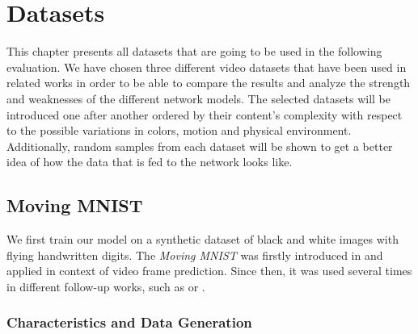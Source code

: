 
\chapter{Datasets} \label{chapter:datasets}

This chapter presents all datasets that are going to be used in the following evaluation. We have chosen three different video datasets that have been used in related works in order to be able to compare the results and analyze the strength and weaknesses of the different network models. The selected datasets will be introduced one after another ordered by their content's complexity with respect to the possible variations in colors, motion and physical environment. Additionally, random samples from each dataset will be shown to get a better idea of how the data that is fed to the network looks like.


\section{Moving MNIST} \label{sec:ds_mm}


We first train our model on a synthetic dataset of black and white images with flying handwritten digits. The \textit{Moving MNIST} was firstly introduced in \parencite{unsup_learn_lstm} and applied in context of video frame prediction. Since then, it was used several times in different follow-up works, such as \parencite{spat_temp_video_autoenc} or \parencite{conv_lstm_nowcasting}. 

\subsection{Characteristics and Data Generation}

